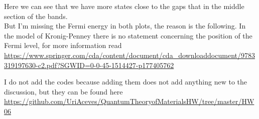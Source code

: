 \begin{questions}
\begin{solution}
\label{hist}\vspace{0.5cm}

Here we can see that we have more states close to the gaps that in the middle section of the bands.\\

 But I'm missing the Fermi energy in both plots, the reason is the following. In the model of Kronig-Penney there is no statement concerning the position of the Fermi level, for more information read \url{https://www.springer.com/cda/content/document/cda_downloaddocument/9783319197630-c2.pdf?SGWID=0-0-45-1514427-p177405762}

 I do not add the codes because adding them does not add anything new to the discussion, but they can be found here \url{https://github.com/UriAceves/QuantumTheoryofMaterialsHW/tree/master/HW06}

 \end{solution}

\end{questions}

%
%
